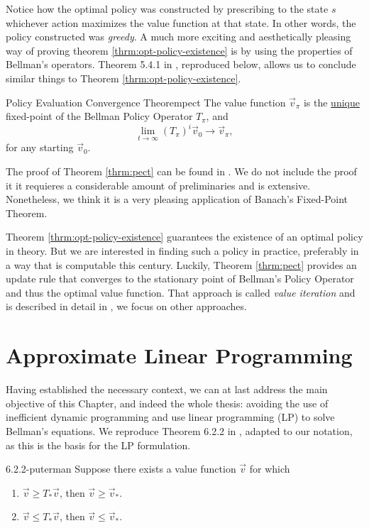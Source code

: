 Notice how the optimal policy was constructed by prescribing to the state $s$
whichever action maximizes the value function at that state. In other words, the
policy constructed was \emph{greedy}. A much more exciting and aesthetically
pleasing way of proving theorem \ref{thrm:opt-policy-existence} is by using the
properties of Bellman's operators. Theorem 5.4.1 in \cite[pg.~130]{raoRL4F},
reproduced below, allows us to conclude similar things to Theorem
\ref{thrm:opt-policy-existence}.

\begin{thrm}{Policy Evaluation Convergence Theorem}{pect}
    The value function $\vec{v}_\pi$ is the \underline{unique} fixed-point of
    the Bellman Policy Operator $T_\pi$, and
    \[
        \lim_{t \to \infty} (T_\pi)^{i} \vec{v}_0  \to \vec{v}_\pi,
    \]
    for any starting $\vec{v}_0$.
\end{thrm}

The proof of Theorem \ref{thrm:pect} can be found in \cite[pg.~131]{raoRL4F}. We
do not include the proof it it requieres a considerable amount of preliminaries
and is extensive. Nonetheless, we think it is a very pleasing application of
Banach's Fixed-Point Theorem.

Theorem \ref{thrm:opt-policy-existence} guarantees the existence of an optimal
policy in theory. But we are interested in finding such a policy in practice,
preferably in a way that is computable this century. Luckily, Theorem
\ref{thrm:pect} provides an update rule that converges to the stationary point
of Bellman's Policy Operator and thus the optimal value function. That approach
is called \emph{value iteration} and is described in detail in
\cite{SuttonBarto,raoRL4F}, we focus on other approaches.

\section{Approximate Linear Programming}

Having established the necessary context, we can at last address the main
objective of this Chapter, and indeed the whole thesis: avoiding the use of
inefficient dynamic programming and use linear programming (LP) to solve
Bellman's equations. We reproduce Theorem 6.2.2 in
\cite[Ch.~6.9.1]{puterman2014}, adapted to our notation, as this is the basis
for the LP formulation.

\begin{thrm}{}{6.2.2-puterman}
    Suppose there exists a value function $\vec{v}$ for which
    \begin{enumerate}
        \item $\vec{v} \geq T_{*} \vec{v}$, then $\vec{v} \geq \vec{v}_*$.
        \item $\vec{v} \leq T_{*} \vec{v}$, then $\vec{v} \leq \vec{v}_*$.
    \end{enumerate}
\end{thrm}

